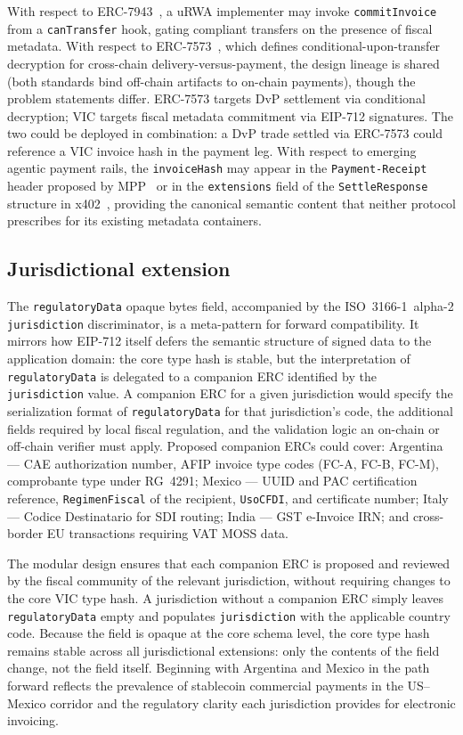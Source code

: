 \documentclass[11pt,a4paper]{article}
\begin{document}
With respect to ERC-7943~\cite{erc7943}, a uRWA implementer may invoke \texttt{commitInvoice} from a \texttt{canTransfer} hook, gating compliant transfers on the presence of fiscal metadata. With respect to ERC-7573~\cite{erc7573}, which defines conditional-upon-transfer decryption for cross-chain delivery-versus-payment, the design lineage is shared (both standards bind off-chain artifacts to on-chain payments), though the problem statements differ. ERC-7573 targets DvP settlement via conditional decryption; VIC targets fiscal metadata commitment via EIP-712 signatures. The two could be deployed in combination: a DvP trade settled via ERC-7573 could reference a VIC invoice hash in the payment leg. With respect to emerging agentic payment rails, the \texttt{invoiceHash} may appear in the \texttt{Payment-Receipt} header proposed by MPP~\cite{mpp} or in the \texttt{extensions} field of the \texttt{SettleResponse} structure in x402~\cite{x402}, providing the canonical semantic content that neither protocol prescribes for its existing metadata containers.

\subsection{Jurisdictional extension}

The \texttt{regulatoryData} opaque bytes field, accompanied by the ISO~3166-1~alpha-2 \texttt{jurisdiction} discriminator, is a meta-pattern for forward compatibility. It mirrors how EIP-712 itself defers the semantic structure of signed data to the application domain: the core type hash is stable, but the interpretation of \texttt{regulatoryData} is delegated to a companion ERC identified by the \texttt{jurisdiction} value. A companion ERC for a given jurisdiction would specify the serialization format of \texttt{regulatoryData} for that jurisdiction's code, the additional fields required by local fiscal regulation, and the validation logic an on-chain or off-chain verifier must apply. Proposed companion ERCs could cover: Argentina --- CAE authorization number, AFIP invoice type codes (FC-A, FC-B, FC-M), comprobante type under RG~4291; Mexico --- UUID and PAC certification reference, \texttt{RegimenFiscal} of the recipient, \texttt{UsoCFDI}, and certificate number; Italy --- Codice Destinatario for SDI routing; India --- GST e-Invoice IRN; and cross-border EU transactions requiring VAT MOSS data.

The modular design ensures that each companion ERC is proposed and reviewed by the fiscal community of the relevant jurisdiction, without requiring changes to the core VIC type hash. A jurisdiction without a companion ERC simply leaves \texttt{regulatoryData} empty and populates \texttt{jurisdiction} with the applicable country code. Because the field is opaque at the core schema level, the core type hash remains stable across all jurisdictional extensions: only the contents of the field change, not the field itself. Beginning with Argentina and Mexico in the path forward reflects the prevalence of stablecoin commercial payments in the US--Mexico corridor and the regulatory clarity each jurisdiction provides for electronic invoicing.
\end{document}
